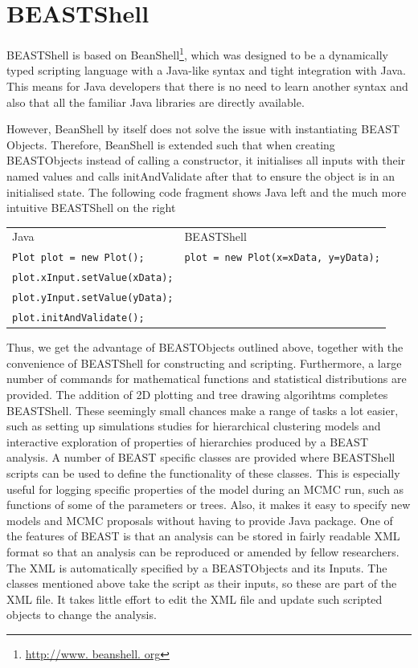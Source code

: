 \documentclass[twoside,11pt]{article}
\begin{document}
\section{BEASTShell}

BEASTShell is based on BeanShell\footnote{\url{http://www. beanshell. org}}, which was designed to be a dynamically typed scripting language with a Java-like syntax and tight integration with Java. This means for Java developers that there is no need to learn another syntax and also that all the familiar Java libraries are directly available.

However, BeanShell by itself does not solve the issue with instantiating BEAST Objects. Therefore, BeanShell is extended such that when creating BEASTObjects instead of calling a constructor, it initialises all inputs with their named values and calls initAndValidate after that to ensure the object is in an initialised state. The following code fragment shows Java left and the much more intuitive BEASTShell on the 
right

\begin{tabular}{ll}
Java & BEASTShell\\
\tt	Plot plot = new Plot(); & \tt plot = new Plot(x=xData, y=yData);\\
\tt	plot.xInput.setValue(xData);\\
\tt	plot.yInput.setValue(yData);\\
\tt	plot.initAndValidate();\\
\end{tabular}
\rm

Thus, we get the advantage of BEASTObjects outlined above, together with the convenience of BEASTShell for constructing and scripting. Furthermore, a large number of commands for mathematical functions and statistical distributions are provided. The addition of 2D plotting and tree drawing algorihtms completes BEASTShell.
%
These seemingly small chances make a range of tasks a lot easier, such as setting up simulations studies for hierarchical clustering models and interactive exploration of properties of hierarchies produced by a BEAST 
analysis. A number of BEAST specific classes are provided where BEASTShell scripts can be used to define the functionality of these classes. This is especially useful for logging specific properties of the model during an MCMC run, such as functions of some of the parameters or trees. Also, it makes it easy to specify new models and MCMC proposals without having to provide Java package. One of the features of BEAST is that an analysis can be stored in fairly readable XML format so that an analysis can be reproduced or amended by fellow researchers. The XML is automatically specified by a BEASTObjects and its Inputs. The classes mentioned above take the script as their inputs, so these are part of the XML file. It takes little effort to edit the XML file and update such scripted objects to change the analysis.
\end{document}
